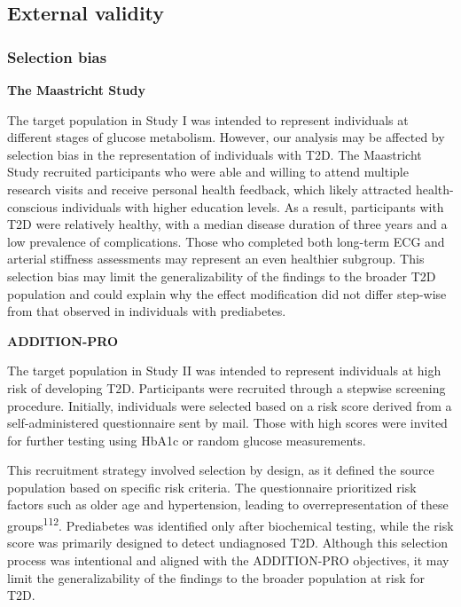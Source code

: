 \documentclass[
  a4paper,
  headsepline=true,
  open=any]{scrbook}
\begin{document}
\hypertarget{external-validity}{%
\subsection{External validity}\label{external-validity}}

\hypertarget{selection-bias}{%
\subsubsection{Selection bias}\label{selection-bias}}

\textbf{The Maastricht Study}

The target population in Study I was intended to represent individuals
at different stages of glucose metabolism. However, our analysis may be
affected by selection bias in the representation of individuals with
T2D. The Maastricht Study recruited participants who were able and
willing to attend multiple research visits and receive personal health
feedback, which likely attracted health-conscious individuals with
higher education levels. As a result, participants with T2D were
relatively healthy, with a median disease duration of three years and a
low prevalence of complications. Those who completed both long-term ECG
and arterial stiffness assessments may represent an even healthier
subgroup. This selection bias may limit the generalizability of the
findings to the broader T2D population and could explain why the effect
modification did not differ step-wise from that observed in individuals
with prediabetes.

\textbf{ADDITION-PRO}

The target population in Study II was intended to represent individuals
at high risk of developing T2D. Participants were recruited through a
stepwise screening procedure. Initially, individuals were selected based
on a risk score derived from a self-administered questionnaire sent by
mail. Those with high scores were invited for further testing using
HbA1c or random glucose measurements.

This recruitment strategy involved selection by design, as it defined
the source population based on specific risk criteria. The questionnaire
prioritized risk factors such as older age and hypertension, leading to
overrepresentation of these groups\textsuperscript{112}. Prediabetes was
identified only after biochemical testing, while the risk score was
primarily designed to detect undiagnosed T2D. Although this selection
process was intentional and aligned with the ADDITION-PRO objectives, it
may limit the generalizability of the findings to the broader population
at risk for T2D.
\end{document}
